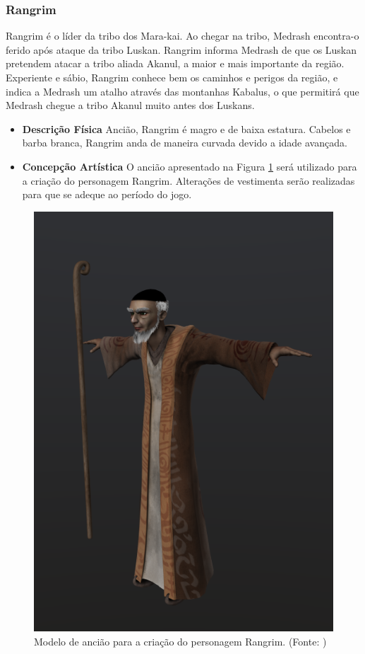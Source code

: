 \subsubsection{Rangrim}
Rangrim é o líder da tribo dos Mara-kai. Ao chegar na tribo, Medrash
 encontra-o ferido após ataque da tribo Luskan. Rangrim informa Medrash de
 que os Luskan pretendem atacar a tribo aliada Akanul, a maior e mais
 importante da região. Experiente e sábio, Rangrim conhece bem os caminhos
 e perigos da região, e indica a Medrash um atalho através das montanhas
 Kabalus, o que permitirá que Medrash chegue a tribo Akanul muito antes dos
 Luskans.
\begin{itemize}
\item {\bf Descrição Física}
Ancião, Rangrim é magro e de baixa estatura. Cabelos e barba branca,
 Rangrim anda de maneira curvada devido a idade avançada.
\item {\bf Concepção Artística}
O ancião apresentado na Figura \ref{img:rangrim} será utilizado para a criação
 do personagem Rangrim. Alterações de vestimenta serão realizadas para que
 se adeque ao período do jogo.

\end{itemize}
\begin{figure}[H]
 \centering
 \includegraphics[scale=0.5]{Imagens/rangrim01.png}
 \caption{Modelo de ancião para a criação do personagem Rangrim. (Fonte: \cite{bib:rangrim01})}
\label{img:rangrim}
\end{figure}

